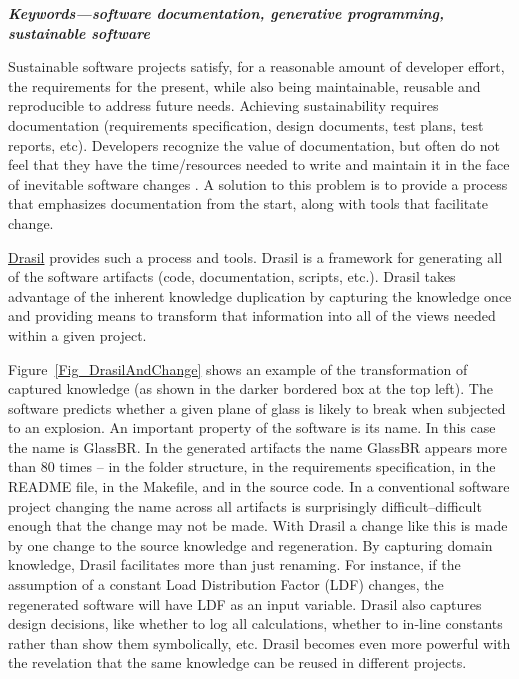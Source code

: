 \documentclass[onecolumn]{IEEEtran}
\begin{document}
\begin{multicols}{2}
  
  
\textbf{\emph{Keywords---software documentation, generative programming, sustainable
    software}}
\medskip

Sustainable software projects satisfy, for a reasonable amount of developer
effort, the requirements for the present, while also being maintainable,
reusable and reproducible to address future needs.  Achieving sustainability
requires documentation (requirements specification, design documents, test
plans, test reports, etc).  Developers recognize the value of documentation, but
often do not feel that they have the time/resources needed to write and maintain
it in the face of inevitable software changes
\cite{SmithJegatheesanAndKelly2016}.  A solution to this problem is to provide a
process that emphasizes documentation from the start, along with tools that
facilitate change.

\href{https://github.com/JacquesCarette/Drasil} {Drasil} provides such a process
and tools.  Drasil is a framework for generating all of the software artifacts
(code, documentation, scripts, etc.).  Drasil takes advantage of the inherent
knowledge duplication by capturing the knowledge once and providing means to
transform that information into all of the views needed within a given project.

Figure~\ref{Fig_DrasilAndChange} shows an example of the transformation of
captured knowledge (as shown in the darker bordered box at the top left).  The
software predicts whether a given plane of glass is likely to break when
subjected to an explosion.  An important property of the software is its name.
In this case the name is GlassBR.  In the generated artifacts the name GlassBR
appears more than 80 times -- in the folder structure, in the requirements
specification, in the README file, in the Makefile, and in the source code.  In
a conventional software project changing the name across all artifacts is
surprisingly difficult--difficult enough that the change may not be made.  With
Drasil a change like this is made by one change to the source knowledge and
regeneration.  By capturing domain knowledge, Drasil facilitates more than just
renaming.  For instance, if the assumption of a constant Load Distribution
Factor (LDF) changes, the regenerated software will have LDF as an input
variable.  Drasil also captures design decisions, like whether to log all
calculations, whether to in-line constants rather than show them symbolically,
etc. Drasil becomes even more powerful with the revelation that the same
knowledge can be reused in different projects.


\end{multicols}
\end{document}
